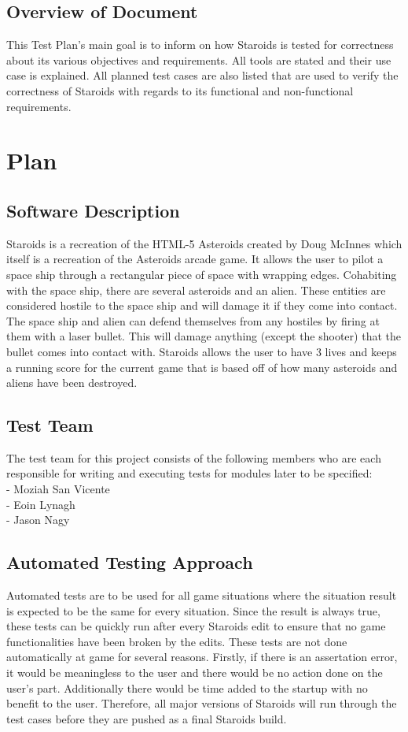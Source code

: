 \documentclass[12pt, titlepage]{article}
\begin{document}
\subsection{Overview of Document}
This Test Plan's main goal is to inform on how Staroids is tested for correctness about its various objectives and requirements. All tools are stated and their use case is explained. All planned test cases are also listed that are used to verify the correctness of Staroids with regards to its functional and non-functional requirements.

\section{Plan}

\subsection{Software Description}
Staroids is a recreation of the HTML-5 Asteroids created by Doug McInnes which itself is a recreation of the Asteroids arcade game. It allows the user to pilot a space ship through a rectangular piece of space with wrapping edges. Cohabiting with the space ship, there are several asteroids and an alien. These entities are considered hostile to the space ship and will damage it if they come into contact. The space ship and alien can defend themselves from any hostiles by firing at them with a laser bullet. This will damage anything (except the shooter) that the bullet comes into contact with. Staroids allows the user to have 3 lives and keeps a running score for the current game that is based off of how many asteroids and aliens have been destroyed.

\subsection{Test Team}
The test team for this project consists of the following members who are each responsible for writing and executing tests for modules later to be specified:\\
- Moziah San Vicente\\
- Eoin Lynagh\\
- Jason Nagy\\

\subsection{Automated Testing Approach}
Automated tests are to be used for all game situations where the situation result is expected to be the same for every situation. Since the result is always true, these tests can be quickly run after every Staroids edit to ensure that no game functionalities have been broken by the edits. These tests are not done automatically at game for several reasons. Firstly, if there is an assertation error, it would be meaningless to the user and there would be no action done on the user's part. Additionally there would be time added to the startup with no benefit to the user. Therefore, all major versions of Staroids will run through the test cases before they are pushed as a final Staroids build.
\end{document}
